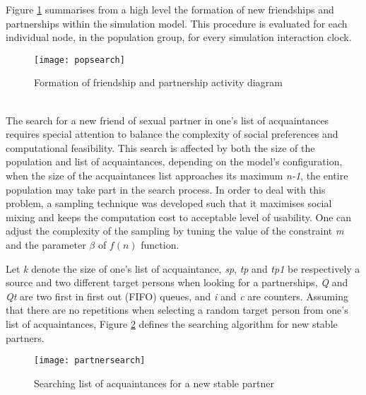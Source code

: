 Figure \ref{popsearch} summarises from a high level the formation of new friendships and
partnerships within the simulation model. This procedure is evaluated for each individual
node, in the population group, for every simulation interaction clock.
\begin{figure}[h]
\begin{center}
\texttt{[image: popsearch]}
\caption{Formation of friendship and partnership activity diagram} \label{popsearch}
\end{center}
\end{figure}\\
The search for a new friend of sexual partner in one's list of acquaintances requires
special attention to balance the complexity of social preferences and computational
feasibility. This search is affected by both the size of the population and list of
acquaintances, depending on the model's configuration, when the size of the acquaintances
list approaches its maximum \emph{n-1}, the entire population may take part in the search
process. In order to deal with this problem, a sampling technique was developed such that
it maximises social mixing and keeps the computation cost to acceptable level of
usability. One can adjust the complexity of the sampling by tuning the value of the
constraint \emph{m} and the parameter $\beta$ of $f(n)$ function.

Let \emph{k} denote the size of one's list of acquaintance, \emph{sp}, \emph{tp} and
\emph{tp1} be respectively a source and two different target persons when looking for a
partnerships, \emph{Q} and \emph{Qt} are two first in first out (FIFO) queues, and
\emph{i} and \emph{c} are counters. Assuming that there are no repetitions when selecting
a random target person from one's list of acquaintances, Figure \ref{partnersearch}
defines the searching algorithm for new stable partners.
\begin{figure}[h]
\begin{center}
\texttt{[image: partnersearch]}
\caption{Searching list of acquaintances for a new stable partner} \label{partnersearch}
\end{center}
\end{figure}

